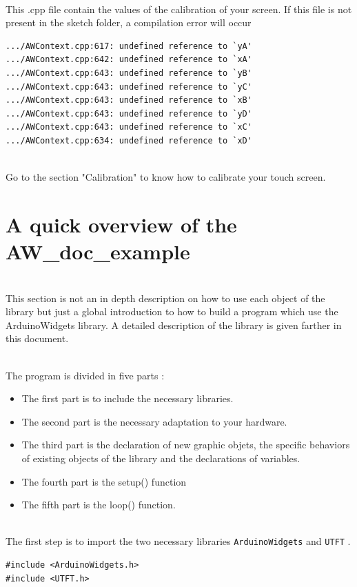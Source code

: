 \documentclass[a4paper,11pt]{extarticle}
\begin{document}
~\\ This .cpp file contain the values of the calibration of your screen.
If this file is not present in the sketch folder, a compilation error will occur

\begin{lstlisting}[language=Arduinonl]
.../AWContext.cpp:617: undefined reference to `yA'
.../AWContext.cpp:642: undefined reference to `xA'
.../AWContext.cpp:643: undefined reference to `yB'
.../AWContext.cpp:643: undefined reference to `yC'
.../AWContext.cpp:643: undefined reference to `xB'
.../AWContext.cpp:643: undefined reference to `yD'
.../AWContext.cpp:643: undefined reference to `xC'
.../AWContext.cpp:634: undefined reference to `xD'
\end{lstlisting}

~\\ Go to the section "Calibration" to know how to calibrate your touch screen.

\newpage
\section{A quick overview of the AW\_doc\_example}

~\\This section is not an in depth description on how to use each object of the library but just a global introduction to how to build a program which use the ArduinoWidgets library. A detailed description of the library is given farther in this document.

~\\ The program is divided in five parts :
\begin{itemize}
  \item The first part is to include the necessary libraries.
  \item The second part is the necessary adaptation to your hardware.
  \item The third part is the declaration of new graphic objets, the specific behaviors of existing objects of the library and the declarations of variables.
  \item The fourth part is the setup() function
  \item The fifth part is the loop() function.
\end{itemize}

~\\The first step is to import the two necessary libraries \texttt{ArduinoWidgets} and \texttt{UTFT} .
\begin{lstlisting}[language=Arduinonl]
#include <ArduinoWidgets.h>
#include <UTFT.h>
\end{lstlisting}
\end{document}

